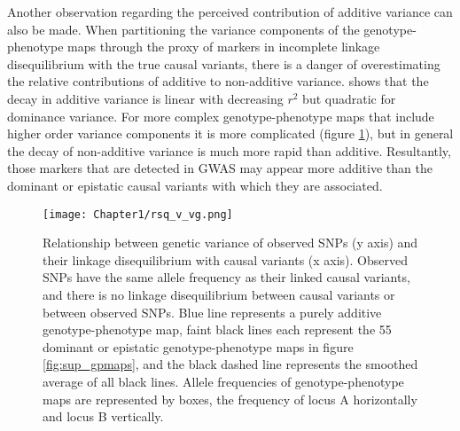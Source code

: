 Another observation regarding the perceived contribution of additive variance can also be made. When partitioning the variance components of the genotype-phenotype maps through the proxy of markers in incomplete linkage disequilibrium with the true causal variants, there is a danger of overestimating the relative contributions of additive to non-additive variance. \cite{Weir2008} shows that the decay in additive variance is linear with decreasing $r^2$ but quadratic for dominance variance. For more complex genotype-phenotype maps that include higher order variance components it is more complicated (figure \ref{fig:rsq_v_vg}), but in general the decay of non-additive variance is much more rapid than additive. Resultantly, those markers that are detected in GWAS may appear more additive than the dominant or epistatic causal variants with which they are associated.

\begin{figure}
\begin{center}
\texttt{[image: Chapter1/rsq\_v\_vg.png]} \\
\caption[Epistatic variance estimates as a function of LD]{Relationship between genetic variance of observed SNPs (y axis) and their linkage disequilibrium with causal variants (x axis). Observed SNPs have the same allele frequency as their linked causal variants, and there is no linkage disequilibrium between causal variants or between observed SNPs. Blue line represents a purely additive genotype-phenotype map, faint black lines each represent the 55 dominant or epistatic genotype-phenotype maps in figure \ref{fig:sup_gpmaps}, and the black dashed line represents the smoothed average of all black lines. Allele frequencies of genotype-phenotype maps are represented by boxes, the frequency of locus A horizontally and locus B vertically.}
\label{fig:rsq_v_vg}
\end{center}
\end{figure}


